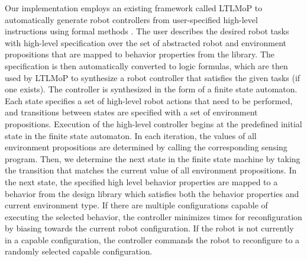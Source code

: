 \documentclass[journal]{IEEEtran}
\begin{document}
Our implementation employs an existing framework called LTLMoP to automatically generate robot controllers from user-specified high-level instructions using formal methods \cite{DBLP:conf/iros/FinucaneJK10,DBLP:journals/trob/Kress-GazitFP09}.
The user describes the desired robot tasks with high-level specification over the set of abstracted robot and environment propositions that are mapped to behavior properties from the library.
The specification is then automatically converted to logic formulas, which are then used by LTLMoP to synthesize a robot controller that satisfies the given tasks (if one exists).
The controller is synthesized in the form of a finite state automaton.
Each state specifies a set of high-level robot actions that need to be performed, and transitions between states are specified with a set of environment propositions.
Execution of the high-level controller begins at the predefined initial state in the finite state automaton. In each iteration, the values of all environment propositions are determined by calling the corresponding sensing program. Then, we determine the next state in the finite state machine by taking the transition that matches the current value of all environment propositions. 
In the next state, the specified high level behavior properties are mapped to a behavior from the design library which satisfies both the behavior properties and current environment type.
If there are multiple configurations capable of executing the selected behavior, the controller minimizes times for reconfiguration by biasing towards the current robot configuration.
If the robot is not currently in a capable configuration, the controller commands the robot to reconfigure to a randomly selected capable configuration.

\end{document}
